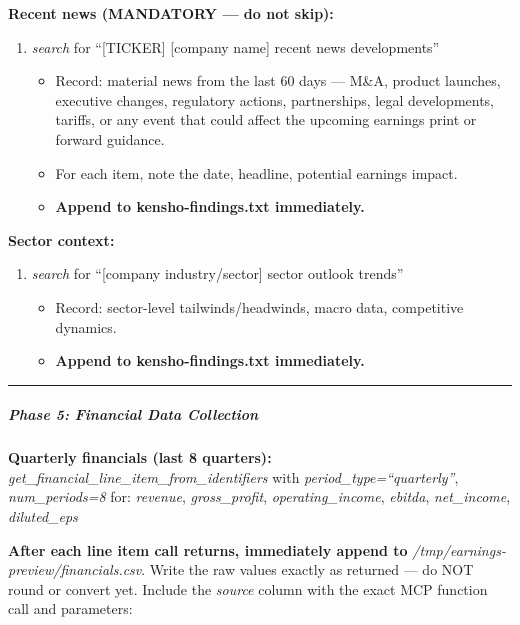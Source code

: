 \documentclass[11pt]{article}
\begin{document}
\textbf{Recent news (MANDATORY — do not skip):}

\begin{enumerate}[leftmargin=*,itemsep=2pt,topsep=2pt]
\item {} \emph{search} for ``[TICKER] [company name] recent news developments''
\begin{itemize}[leftmargin=*,itemsep=2pt,topsep=2pt]
\item {} Record: material news from the last 60 days — M\&A, product launches, executive changes, regulatory actions, partnerships, legal developments, tariffs, or any event that could affect the upcoming earnings print or forward guidance.
\item {} For each item, note the date, headline, potential earnings impact.
\item {} \textbf{Append to kensho-findings.txt immediately.}
\end{itemize}
\end{enumerate}

\textbf{Sector context:}

\begin{enumerate}[leftmargin=*,itemsep=2pt,topsep=2pt]
\item {} \emph{search} for ``[company industry/sector] sector outlook trends''
\begin{itemize}[leftmargin=*,itemsep=2pt,topsep=2pt]
\item {} Record: sector-level tailwinds/headwinds, macro data, competitive dynamics.
\item {} \textbf{Append to kensho-findings.txt immediately.}
\end{itemize}
\end{enumerate}

\vspace{0.5em}\hrule\vspace{0.5em}

\subparagraph{Phase 5: Financial Data Collection}\mbox{}\par

\textbf{Quarterly financials (last 8 quarters):} \emph{get\_\allowbreak{}financial\_\allowbreak{}line\_\allowbreak{}item\_\allowbreak{}from\_\allowbreak{}identifiers} with \emph{period\_\allowbreak{}type=``quarterly''}, \emph{num\_\allowbreak{}periods=8} for: \emph{revenue}, \emph{gross\_\allowbreak{}profit}, \emph{operating\_\allowbreak{}income}, \emph{ebitda}, \emph{net\_\allowbreak{}income}, \emph{diluted\_\allowbreak{}eps}


\textbf{After each line item call returns, immediately append to} \emph{/tmp/earnings-preview/financials.csv}. Write the raw values exactly as returned — do NOT round or convert yet. Include the \emph{source} column with the exact MCP function call and parameters:
\end{document}
